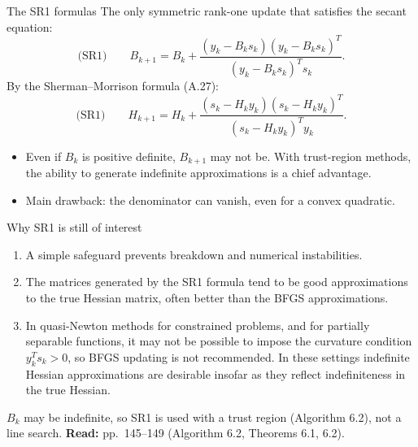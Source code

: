 \documentclass[aspectratio=169,12pt]{beamer}
\newcommand{\readbook}[1]{{\color{red}\textbf{Read:} #1}}
\begin{document}
\begin{frame}{The SR1 formulas}
  The only symmetric rank-one update that satisfies the secant equation:
  \[
    \text{(SR1)}\qquad
    B_{k+1}=B_{k}+\frac{(y_{k}-B_{k}s_{k})(y_{k}-B_{k}s_{k})^{T}}{(y_{k}-B_{k}s_{k})^{T}s_{k}} .
    \tag{6.24}
  \]
  By the Sherman--Morrison formula (A.27):
  \[
    \text{(SR1)}\qquad
    H_{k+1}=H_{k}+\frac{(s_{k}-H_{k}y_{k})(s_{k}-H_{k}y_{k})^{T}}{(s_{k}-H_{k}y_{k})^{T}y_{k}} .
    \tag{6.25}
  \]

  \begin{itemize}\setlength\itemsep{0.3em}
    \item Even if $B_{k}$ is positive definite, $B_{k+1}$ \alert{may not be}. With trust-region
      methods, the ability to generate indefinite approximations is a chief advantage.
    \item Main drawback: \alert{the denominator can vanish}, even for a convex quadratic.
  \end{itemize}
\end{frame}

\begin{frame}{Why SR1 is still of interest}
  \begin{enumerate}\setlength\itemsep{0.5em}
    \item[(i)] A simple safeguard prevents breakdown and numerical instabilities.
    \item[(ii)] The matrices generated by the SR1 formula tend to be \alert{good approximations
      to the true Hessian matrix}, often better than the BFGS approximations.
    \item[(iii)] In quasi-Newton methods for constrained problems, and for partially
      separable functions, it may not be possible to impose the curvature condition
      $y_{k}^{T}s_{k}>0$, so BFGS updating is not recommended. In these settings indefinite
      Hessian approximations are desirable insofar as they reflect indefiniteness in the
      true Hessian.
  \end{enumerate}

  \vspace{0.2em}
  $B_{k}$ may be indefinite, so SR1 is used with a \alert{trust region} (Algorithm 6.2), not a line search.
  \readbook{pp.~145--149 (Algorithm 6.2, Theorems 6.1, 6.2).}
\end{frame}
\end{document}
